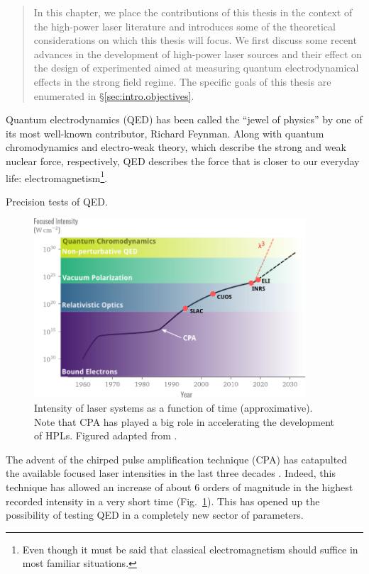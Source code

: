 \documentclass[11pt,SymmetricalJury]{inrsthesis/inrsthesis}
\newenvironment{chaptersummary}{%
  \begin{quotation}
  \SingleSpacing
  \setlength{\parskip}{\baselineskip}}{%
  \end{quotation}}
\begin{document}
\begin{chaptersummary}
  In this chapter, we place the contributions of this thesis in the context
  of the high-power laser literature and introduces some of the theoretical
  considerations on which this thesis will focus. We first discuss some recent
  advances in the development of high-power laser sources and their effect
  on the design of experimented aimed at measuring quantum electrodynamical
  effects in the strong field regime. The specific goals of this thesis are
  enumerated in \S\ref{sec:intro.objectives}.
\end{chaptersummary}

Quantum electrodynamics (QED) has been called the ``jewel of physics'' by one
of its most well-known contributor, Richard Feynman. Along with quantum
chromodynamics and electro-weak theory, which describe the strong and
weak nuclear force, respectively, QED describes the force that is closer
to our everyday life: electromagnetism\footnote{Even though it must be
said that classical electromagnetism should suffice in most
familiar situations.}.

Precision tests of QED.

\begin{figure}
  \centering
  \includegraphics[width=0.9\textwidth]{figs/IntensityHistory.pdf}
  \caption[Short history of the intensity of laser systems.]
          {Intensity of laser systems as a function of time (approximative).
           Note that CPA has played a big role in accelerating the development
           of HPLs.
           Figured adapted from \cite{Mourou2015}.}
  \label{fig:intro.intensity-history}
\end{figure}


The advent of the chirped pulse amplification technique (CPA) has catapulted
the available focused laser intensities in the last three decades
\cite{Mourou2006}. Indeed, this technique has allowed an increase of about
6 orders of magnitude in the highest recorded intensity in a very short time
(Fig.~\ref{fig:intro.intensity-history}). This has opened up the possibility
of testing QED in a completely new sector of parameters.
\end{document}
